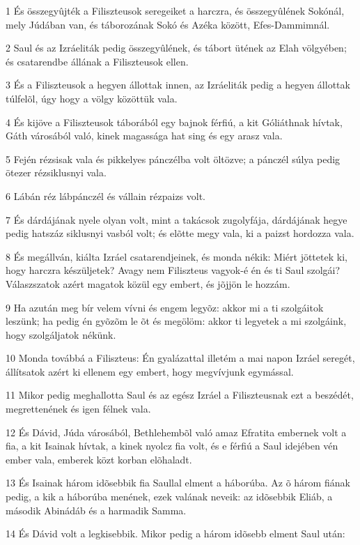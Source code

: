 \par 1 És összegyûjték a Filiszteusok seregeiket a harczra, és összegyûlének Sokónál, mely Júdában van, és táborozának Sokó és  Azéka között, Efes-Dammimnál.
\par 2 Saul és az Izráeliták pedig összegyûlének, és tábort ütének az Elah völgyében; és csatarendbe állának a Filiszteusok ellen.
\par 3 És a Filiszteusok a hegyen állottak innen, az Izráeliták pedig a hegyen állottak túlfelõl, úgy hogy a völgy közöttük vala.
\par 4 És kijöve a Filiszteusok táborából egy bajnok férfiú, a kit Góliáthnak hívtak, Gáth városából való, kinek magassága hat sing és egy arasz vala.
\par 5 Fején rézsisak vala és pikkelyes pánczélba volt öltözve; a pánczél súlya pedig ötezer rézsiklusnyi vala.
\par 6 Lábán réz lábpánczél és vállain rézpaizs volt.
\par 7 És dárdájának nyele olyan volt, mint a takácsok zugolyfája, dárdájának hegye pedig hatszáz siklusnyi vasból volt; és elõtte megy vala, ki a paizst hordozza vala.
\par 8 És megállván, kiálta Izráel csatarendjeinek, és monda nékik: Miért jöttetek ki, hogy harczra készüljetek? Avagy nem Filiszteus vagyok-é én és ti Saul szolgái? Válaszszatok azért magatok közül egy embert, és jõjjön le hozzám.
\par 9 Ha azután meg bír velem vívni és engem legyõz: akkor mi a ti szolgáitok leszünk; ha pedig én gyõzõm le õt és megölöm: akkor ti legyetek a mi szolgáink, hogy szolgáljatok nékünk.
\par 10 Monda továbbá a Filiszteus: Én gyalázattal illetém a mai napon Izráel seregét, állítsatok azért ki ellenem egy embert, hogy megvívjunk egymással.
\par 11 Mikor pedig meghallotta Saul és az egész Izráel a Filiszteusnak ezt a beszédét, megrettenének és igen félnek vala.
\par 12 És Dávid, Júda városából, Bethlehembõl való amaz Efratita embernek volt a fia, a kit Isainak hívtak, a kinek nyolcz fia volt, és e férfiú a Saul idejében vén ember vala, emberek közt korban elõhaladt.
\par 13 És Isainak három idõsebbik fia Saullal elment a háborúba. Az õ három fiának pedig, a kik a háborúba menének, ezek valának neveik: az idõsebbik Eliáb, a második Abinádáb és a harmadik Samma.
\par 14 És Dávid volt a legkisebbik. Mikor pedig a három idõsebb elment Saul után:
